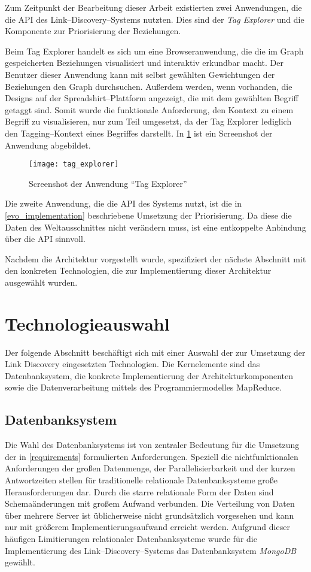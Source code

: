 Zum Zeitpunkt der Bearbeitung dieser Arbeit existierten zwei Anwendungen, die die API des Link--Discovery--Systems nutzten. Dies sind der \emph{Tag Explorer} und die Komponente zur Priorisierung der Beziehungen.

Beim Tag Explorer handelt es sich um eine Browseranwendung, die die im Graph gespeicherten Beziehungen visualisiert und interaktiv erkundbar macht. Der Benutzer dieser Anwendung kann mit selbst gewählten Gewichtungen der Beziehungen den Graph durchsuchen. Außerdem werden, wenn vorhanden, die Designs auf der Spreadshirt--Plattform angezeigt, die mit dem gewählten Begriff getaggt sind. Somit wurde die funktionale Anforderung, den Kontext zu einem Begriff zu visualisieren, nur zum Teil umgesetzt, da der Tag Explorer lediglich den Tagging--Kontext eines Begriffes darstellt. In \cref{fig:tag_explorer} ist ein Screenshot der Anwendung abgebildet.

\begin{figure}
\centering
\texttt{[image: tag\_explorer]}
\caption{Screenshot der Anwendung ``Tag Explorer''}
\label{fig:tag_explorer}
\end{figure}

Die zweite Anwendung, die die API des Systems nutzt, ist die in \cref{evo_implementation} beschriebene Umsetzung der Priorisierung. Da diese die Daten des Weltausschnittes nicht verändern muss, ist eine entkoppelte Anbindung über die API sinnvoll.

Nachdem die Architektur vorgestellt wurde, spezifiziert der nächste Abschnitt mit den konkreten Technologien, die zur Implementierung dieser Architektur ausgewählt wurden.

\section{Technologieauswahl}
\label{tech}

Der folgende Abschnitt beschäftigt sich mit einer Auswahl der zur Umsetzung der Link Discovery eingesetzten Technologien. Die Kernelemente sind das Datenbanksystem, die konkrete Implementierung der Architekturkomponenten sowie die Datenverarbeitung mittels des Programmiermodelles MapReduce.

\subsection{Datenbanksystem}
\label{db_choice}

Die Wahl des Datenbanksystems ist von zentraler Bedeutung für die Umsetzung der in \cref{requirements} formulierten Anforderungen. Speziell die nichtfunktionalen Anforderungen der großen Datenmenge, der Parallelisierbarkeit und der kurzen Antwortzeiten stellen für traditionelle relationale Datenbanksysteme große Herausforderungen dar. Durch die starre relationale Form der Daten sind Schemaänderungen mit großem Aufwand verbunden. Die Verteilung von Daten über mehrere Server ist üblicherweise nicht grundsätzlich vorgesehen und kann nur mit größerem Implementierungsaufwand erreicht werden. Aufgrund dieser häufigen Limitierungen relationaler Datenbanksysteme wurde für die Implementierung des Link--Discovery--Systems das Datenbanksystem \emph{MongoDB} \cite{mo2013} gewählt.

